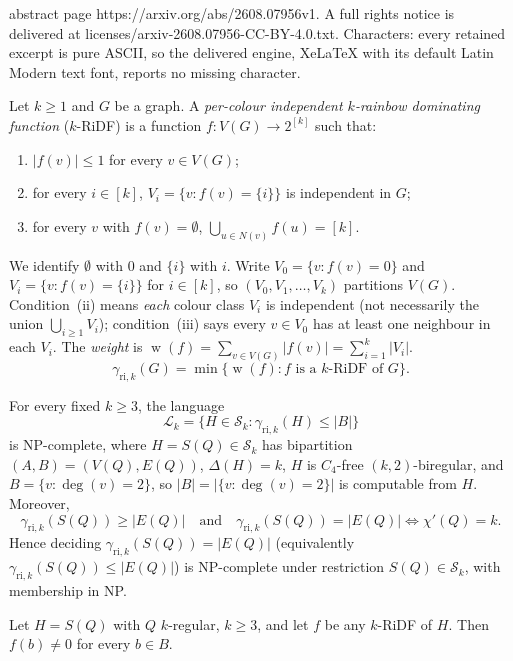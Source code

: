 \documentclass[10pt,a4paper]{amsart}
\DeclareMathOperator{\weight}{w}
\newcommand{\cL}{\mathcal{L}}
\newcommand{\cS}{\mathcal{S}}
\newcommand{\gri}{\gamma_{\mathrm{ri},k}}
\newcommand{\setK}{[k]}
\begin{document}
abstract page https://arxiv.org/abs/2608.07956v1. A full rights notice is delivered at licenses/arxiv-2608.07956-CC-BY-4.0.txt. Characters: every retained excerpt is pure ASCII, so the delivered engine, XeLaTeX with its default Latin Modern text font, reports no missing character.
\begin{definition}\label{def:ridf}
Let $k\ge 1$ and $G$ be a graph.
A \emph{per-colour independent $k$-rainbow dominating function} ($k$-RiDF) is a function $f\colon V(G)\to 2^{\setK}$ such that:
\begin{enumerate}
\item[(i)] $|f(v)|\le 1$ for every $v\in V(G)$;
\item[(ii)] for every $i\in\setK$, $V_{i}=\{v:f(v)=\{i\}\}$ is independent in $G$;
\item[(iii)] for every $v$ with $f(v)=\emptyset$, $\bigcup_{u\in N(v)} f(u)=\setK$.
\end{enumerate}
We identify $\emptyset$ with $0$ and $\{i\}$ with $i$.
Write $V_{0}=\{v:f(v)=0\}$ and $V_{i}=\{v:f(v)=\{i\}\}$ for $i\in\setK$, so $(V_{0},V_{1},\dots,V_{k})$ partitions $V(G)$.
Condition~(ii) means \emph{each} colour class $V_{i}$ is independent (not necessarily the union $\bigcup_{i\ge1}V_{i}$); condition~(iii) says every $v\in V_{0}$ has at least one neighbour in each $V_{i}$.
The \emph{weight} is $\weight(f)=\sum_{v\in V(G)}|f(v)|=\sum_{i=1}^{k}|V_{i}|$.
\[
\gri(G)=\min\{\weight(f): f\text{ is a $k$-RiDF of }G\}.
\]
\end{definition}

\begin{theorem}\label{thm:main}
For every fixed $k\ge 3$, the language
\[
\cL_{k}=\{H\in\cS_{k}:\gri(H)\le |B|\}
\]
is NP-complete, where $H=S(Q)\in\cS_{k}$ has bipartition $(A,B)=(V(Q),E(Q))$, $\Delta(H)=k$, $H$ is $C_{4}$-free $(k,2)$-biregular, and $B=\{v:\deg(v)=2\}$, so $|B|=|\{v:\deg(v)=2\}|$ is computable from $H$.
Moreover,
\[
\gri(S(Q))\ge |E(Q)|\quad\text{and}\quad \gri(S(Q))=|E(Q)|\iff \chi'(Q)=k.
\]
Hence deciding $\gri(S(Q))=|E(Q)|$ (equivalently $\gri(S(Q))\le|E(Q)|$) is NP-complete under restriction $S(Q)\in\cS_{k}$, with membership in NP.
\end{theorem}

\begin{lemma}[$B$-nonzero]\label{lem:Bnonzero}
Let $H=S(Q)$ with $Q$ $k$-regular, $k\ge 3$, and let $f$ be any $k$-RiDF of $H$. Then $f(b)\neq0$ for every $b\in B$.
\end{lemma}
\end{document}
